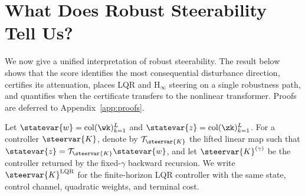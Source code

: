 \section{What Does Robust Steerability Tell Us?}
\label{sec:theory}

We now give a unified interpretation of robust steerability.  The result below
shows that the score identifies the most consequential disturbance direction,
certifies its attenuation, places LQR and $\mathrm{H}_{\infty}$ steering on a
single robustness path, and quantifies when the certificate transfers to the
nonlinear transformer.  Proofs are deferred to Appendix~\ref{app:proofs}.

Let
$\statevar{w}=\operatorname{col}(\wk)_{k=1}^{L}$ and
$\statevar{z}=\operatorname{col}(\zk)_{k=1}^{L}$.  For a controller
$\steervar{K}$, denote by $\mathcal{T}_{\steervar{K}}$ the lifted linear map
such that
$\statevar{z}=\mathcal{T}_{\steervar{K}}\statevar{w}$, and let
$\steervar{K}^{(\gamma)}$ be the controller returned by the fixed-$\gamma$
backward recursion.  We write $\steervar{K}^{\mathrm{LQR}}$ for the
finite-horizon LQR controller with the same state, control channel, quadratic
weights, and terminal cost.

